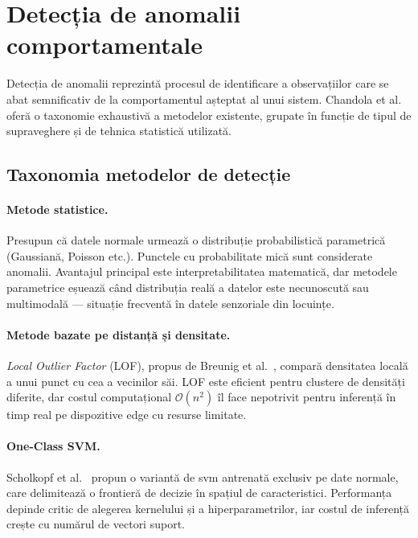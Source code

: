 \section{Detecția de anomalii comportamentale}
\label{sec:studii-anomalii}

Detecția de anomalii reprezintă procesul de identificare a observațiilor care se abat
semnificativ de la comportamentul așteptat al unui sistem. Chandola et al.\
\cite{chandola2009anomaly} oferă o taxonomie exhaustivă a metodelor existente, grupate
în funcție de tipul de supraveghere și de tehnica statistică utilizată.

\subsection{Taxonomia metodelor de detecție}

\paragraph{Metode statistice.} Presupun că datele normale urmează o distribuție
probabilistică parametrică (Gaussiană, Poisson etc.). Punctele cu probabilitate mică
sunt considerate anomalii. Avantajul principal este interpretabilitatea matematică,
dar metodele parametrice eșuează când distribuția reală a datelor este necunoscută
sau multimodală — situație frecventă în datele senzoriale din locuințe.

\paragraph{Metode bazate pe distanță și densitate.} \emph{Local Outlier Factor} (LOF),
propus de Breunig et al.\ \cite{breunig2000lof}, compară densitatea locală a unui punct
cu cea a vecinilor săi. LOF este eficient pentru clustere de densități diferite, dar
costul computațional $\mathcal{O}(n^2)$ îl face nepotrivit pentru inferență în timp real
pe dispozitive edge cu resurse limitate.

\paragraph{One-Class SVM.} Scholkopf et al.\ \cite{scholkopf2001ocsvm} propun o variantă
de \gls{svm} antrenată exclusiv pe date normale, care delimitează o frontieră de decizie
în spațiul de caracteristici. Performanța depinde critic de alegerea kernelului și a
hiperparametrilor, iar costul de inferență crește cu numărul de vectori suport.

